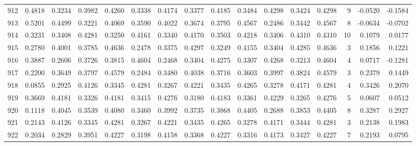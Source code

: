 \begin{tabular}{lrrrrrrrrrrrrrrr}
912 &      0.4818 &  0.3234 &  0.3982 &  0.4260 &  0.3338 &  0.4174 &  0.3377 &  0.4185 &  0.3484 &  0.4298 &   0.3424 &     0.4298 &      9 &                   -0.0520 &                    -0.1584 \\
913 &      0.5201 &  0.4499 &  0.3221 &  0.4069 &  0.3590 &  0.4022 &  0.3674 &  0.3795 &  0.4567 &  0.2486 &   0.3442 &     0.4567 &      8 &                   -0.0634 &                    -0.0702 \\
914 &      0.3231 &  0.3408 &  0.4281 &  0.3250 &  0.4161 &  0.3340 &  0.4170 &  0.3503 &  0.4218 &  0.3406 &   0.4310 &     0.4310 &     10 &                    0.1079 &                     0.0177 \\
915 &      0.2780 &  0.4001 &  0.3785 &  0.4636 &  0.2478 &  0.3375 &  0.4297 &  0.3249 &  0.4155 &  0.3404 &   0.4285 &     0.4636 &      3 &                    0.1856 &                     0.1221 \\
916 &      0.3887 &  0.2606 &  0.3726 &  0.3815 &  0.4604 &  0.2468 &  0.3404 &  0.4275 &  0.3307 &  0.4268 &   0.3213 &     0.4604 &      4 &                    0.0717 &                    -0.1281 \\
917 &      0.2200 &  0.3649 &  0.3797 &  0.4579 &  0.2484 &  0.3480 &  0.4038 &  0.3716 &  0.3603 &  0.3997 &   0.3824 &     0.4579 &      3 &                    0.2379 &                     0.1449 \\
918 &      0.0855 &  0.2925 &  0.4126 &  0.3345 &  0.4281 &  0.3267 &  0.4221 &  0.3435 &  0.4265 &  0.3278 &   0.4171 &     0.4281 &      4 &                    0.3426 &                     0.2070 \\
919 &      0.3669 &  0.4181 &  0.3326 &  0.4181 &  0.3415 &  0.4276 &  0.3180 &  0.4183 &  0.3361 &  0.4229 &   0.3265 &     0.4276 &      5 &                    0.0607 &                     0.0512 \\
920 &      0.1118 &  0.4045 &  0.3539 &  0.4080 &  0.3460 &  0.3992 &  0.3735 &  0.3868 &  0.4405 &  0.2688 &   0.3853 &     0.4405 &      8 &                    0.3287 &                     0.2927 \\
921 &      0.2143 &  0.4126 &  0.3345 &  0.4281 &  0.3267 &  0.4221 &  0.3435 &  0.4265 &  0.3278 &  0.4171 &   0.3444 &     0.4281 &      3 &                    0.2138 &                     0.1983 \\
922 &      0.2034 &  0.2829 &  0.3951 &  0.4227 &  0.3198 &  0.4158 &  0.3368 &  0.4227 &  0.3316 &  0.4173 &   0.3427 &     0.4227 &      7 &                    0.2193 &                     0.0795 \\

\end{tabular}
